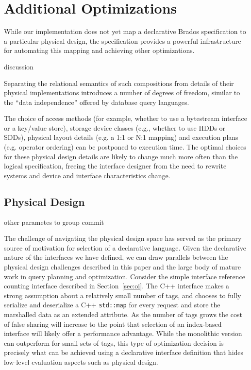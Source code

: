 \section{Additional Optimizations}
\label{sec:opts}

While our implementation does not yet map a declarative Brados specification
to a particular physical design, the specification provides a powerful
infrastructure for automating this mapping and achieving other optimizations.

discussion

Separating the relational semantics of such compositions from details
of their physical implementations introduces a number of degrees of freedom,
similar to the ``data independence'' offered by database query languages.

The
choice of access methods (for example, whether to use a bytestream interface
or a key/value store), storage device classes (e.g., whether to use HDDs or
SDDs), physical layout details (e.g. a 1:1 or N:1 mapping) and execution plans
(e.g. operator ordering) can be postponed to execution time.  The optimal
choices for these physical design details are likely to change much more often
than the logical specification, freeing the interface designer from the need
to rewrite systems and device and interface characteristics change.


\subsection{Physical Design}

other parametes to group commit

The challenge of navigating the physical design space
has served as the primary source of motivation for selection of a declarative
language. Given the declarative nature of the interfaces we have defined,
we can draw parallels between the physical design challenges described in this
paper and the
large body of mature work in query planning and optimization. Consider the
simple interface reference counting interface described in
Section~\ref{sec:oi}.  The C++ interface makes a strong assumption about a
relatively small number of tags, and chooses to fully serialize and
deserialize a C++ \texttt{std::map} for every request and store the marshalled
data as an extended attribute.  As the number of tags grows the cost of false
sharing will increase to the point that selection of an index-based interface
will likely offer a performance advantage. While the monolithic version can
outperform for small sets of tags, this type of optimization decision is
precisely what can be achieved using a declarative interface definition that
hides low-level evaluation aspects such as physical design.

